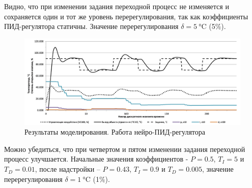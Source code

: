 Видно, что при изменении задания переходной процесс не изменяется и сохраняется один и тот же уровень перерегулирования, так как коэффициенты ПИД-регулятора статичны. Значение перерегулирования $\delta = \SI{5}{\celsius}$ (5\%).

\begin{figure}[H]
    \centering
    \includegraphics[width=\textwidth]{images/chapter_3/Pasteurization_modeling_results_with_neuro_PID.png}
    \caption{Результаты моделирования. Работа нейро-ПИД-регулятора}
    \label{fig:Pasteurization_modeling_results_with_neuro_PID}
\end{figure}

Можно убедиться, что при четвертом и пятом изменении задания переходной процесс улучшается. Начальные значения коэффициентов - $P = 0.5$, $T_I = 5$ и $T_D = 0.01$, после надстройки – $P = 0.43$, $T_I = 0.9$ и $T_D = 0.005$, значение перерегулирования $\delta = \SI{1}{\celsius}$ (1\%).